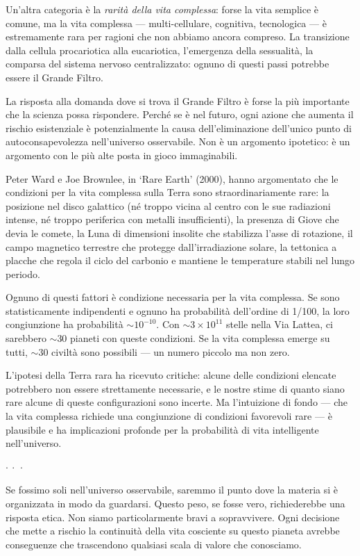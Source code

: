 \documentclass[12pt,a4paper,openany]{book}
\newcommand{\sezione}[1]{\vspace{1.2em}{\large\bfseries #1}\vspace{0.5em}\par}
\newcommand{\puntini}{\begin{center}$\cdot\ \cdot\ \cdot$\end{center}\vspace{0.3em}}
\begin{document}
Un'altra categoria è la \textit{rarità della vita complessa}: forse la vita semplice è comune, ma la vita complessa --- multi-cellulare, cognitiva, tecnologica --- è estremamente rara per ragioni che non abbiamo ancora compreso. La transizione dalla cellula procariotica alla eucariotica, l'emergenza della sessualità, la comparsa del sistema nervoso centralizzato: ognuno di questi passi potrebbe essere il Grande Filtro.

La risposta alla domanda dove si trova il Grande Filtro è forse la più importante che la scienza possa rispondere. Perché se è nel futuro, ogni azione che aumenta il rischio esistenziale è potenzialmente la causa dell'eliminazione dell'unico punto di autoconsapevolezza nell'universo osservabile. Non è un argomento ipotetico: è un argomento con le più alte posta in gioco immaginabili.

\sezione{L'ipotesi della Terra rara}

Peter Ward e Joe Brownlee, in `Rare Earth' (2000), hanno argomentato che le condizioni per la vita complessa sulla Terra sono straordinariamente rare: la posizione nel disco galattico (né troppo vicina al centro con le sue radiazioni intense, né troppo periferica con metalli insufficienti), la presenza di Giove che devia le comete, la Luna di dimensioni insolite che stabilizza l'asse di rotazione, il campo magnetico terrestre che protegge dall'irradiazione solare, la tettonica a placche che regola il ciclo del carbonio e mantiene le temperature stabili nel lungo periodo.

Ognuno di questi fattori è condizione necessaria per la vita complessa. Se sono statisticamente indipendenti e ognuno ha probabilità dell'ordine di 1/100, la loro congiunzione ha probabilità $\sim 10^{-10}$. Con $\sim 3 \times 10^{11}$ stelle nella Via Lattea, ci sarebbero $\sim 30$ pianeti con queste condizioni. Se la vita complessa emerge su tutti, $\sim 30$ civiltà sono possibili --- un numero piccolo ma non zero.

L'ipotesi della Terra rara ha ricevuto critiche: alcune delle condizioni elencate potrebbero non essere strettamente necessarie, e le nostre stime di quanto siano rare alcune di queste configurazioni sono incerte. Ma l'intuizione di fondo --- che la vita complessa richiede una congiunzione di condizioni favorevoli rare --- è plausibile e ha implicazioni profonde per la probabilità di vita intelligente nell'universo.

\puntini

Se fossimo soli nell'universo osservabile, saremmo il punto dove la materia si è organizzata in modo da guardarsi. Questo peso, se fosse vero, richiederebbe una risposta etica. Non siamo particolarmente bravi a sopravvivere. Ogni decisione che mette a rischio la continuità della vita cosciente su questo pianeta avrebbe conseguenze che trascendono qualsiasi scala di valore che conosciamo.
\end{document}
